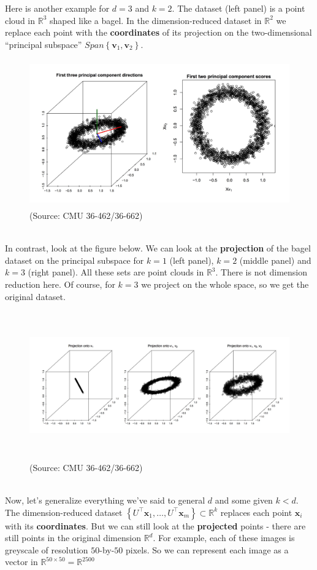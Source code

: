 \documentclass[11pt]{article}
\newcommand{\R}{\ensuremath{\mathbb{R}}}
\newcommand{\V}[1]{\mathbf{#1}}
\begin{document}
Here is another example for $d=3$ and $k=2$. The dataset (left panel) 
is a point cloud in
$\R^3$ shaped like a bagel. In the dimension-reduced dataset in $\R^2$ we
replace each point with the {\bf coordinates} of its projection on the
two-dimensional ``principal subspace'' $Span\left\{ \V{v}_1,\V{v}_2 \right\}$.
\begin{figure}[H]
  \centering
  \includegraphics[height=2.5in]{pca_tib_1.jpeg}    
  \caption{(Source: CMU 36-462/36-662)}
\end{figure}
~\\
In contrast, look at the figure below. We can look at the {\bf projection} of the bagel dataset on the
principal subspace for $k=1$ (left panel), $k=2$ (middle panel) 
and $k=3$ (right panel). All these sets are point clouds in $\R^3$. There is not
dimension reduction here. Of course,
for $k=3$ we project on the whole space, so we get the original dataset.
\begin{figure}[H]
  \centering
  \includegraphics[height=2.5in]{pca_tib_2.jpeg}    
  \caption{(Source: CMU 36-462/36-662)}
\end{figure}
~\\
Now, let's generalize everything we've said to general $d$
and some given $k<d$. The dimension-reduced dataset 
$\left\{ U^\top \V{x}_1,\ldots,U^\top \V{x}_m \right\}\subset\R^k$ replaces each
point $\V{x}_i$ with its {\bf coordinates}. 
But we can still look at the {\bf projected} points - there are still points in
the original dimension $\R^d$. For example, each of these images is greyscale of
resolution $50$-by-$50$ pixels. So we can represent each image as a vector in
$\R^{50\times 50}=\R^{2500}$
\end{document}
